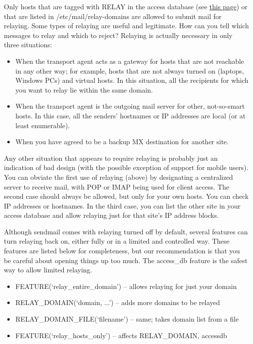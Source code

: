 Only hosts that are tagged with {RELAY} in the access database (see
\protect\hyperlink{part0026_split_034.htmlux5cux23_idTextAnchor1078}{this
page}) or that are listed in
\protect\hypertarget{part0026_split_037.htmlux5cux23_idIndexMarker2564}{}{}{/etc/mail/relay-domains}
are allowed to submit mail for relaying. Some types of relaying are
useful and legitimate. How can you tell which messages to relay and
which to reject? Relaying is actually necessary in only three
situations:

\begin{itemize}
\item
  When the transport agent acts as a gateway for hosts that are not
  reachable in any other way; for example, hosts that are not always
  turned on (laptops, Windows PCs) and virtual hosts. In this situation,
  all the recipients for which you want to relay lie within the same
  domain.
\item
  When the transport agent is the outgoing mail server for other,
  not-so-smart hosts. In this case, all the senders' hostnames or IP
  addresses are local (or at least enumerable).
\item
  When you have agreed to be a backup MX destination for another site.
\end{itemize}

Any other situation that appears to require relaying is probably just an
indication of bad design (with the possible exception of support for
mobile users). You can obviate the first use of relaying (above) by
designating a centralized server to receive mail, with POP or IMAP being
used for client access. The second case should always be allowed, but
only for your own hosts. You can check IP addresses or hostnames. In the
third case, you can list the other site in your access database and
allow relaying just for that site's IP address blocks.

Although {sendmail} comes with relaying turned off by default, several
features can turn relaying back on, either fully or in a limited and
controlled way. These features are listed below for completeness, but
our recommendation is that you be careful about opening things up too
much. The {access\_db} feature is the safest way to allow limited
relaying.

\begin{itemize}
\item
  {FEATURE(`}{\protect\hypertarget{part0026_split_037.htmlux5cux23_idIndexMarker2565}{}{}}{relay\_entire\_domain')}
  -- allows relaying for just your domain
\item
  \protect\hypertarget{part0026_split_037.htmlux5cux23_idIndexMarker2566}{}{}{RELAY\_DOMAIN(`}{domain}{,
  ...')} -- adds more domains to be relayed
\item
  {RELAY\_DOMAIN\_FILE(`}{filename}{')} -- same; takes domain list from
  a file
\item
  {FEATURE(`}{\protect\hypertarget{part0026_split_037.htmlux5cux23_idIndexMarker2567}{}{}}{relay\_hosts\_only')}
  -- affects {RELAY\_DOMAIN}, {accessdb}
\end{itemize}

